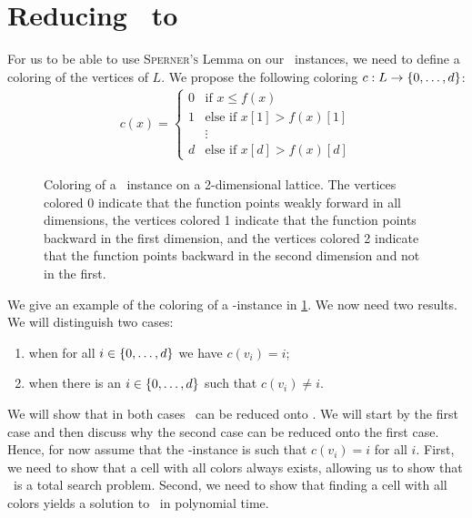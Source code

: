 \section{Reducing \Tarskistar\ to \Sperner}\label{sec:tarskistar_to_sperner}

For us to be able to use \textsc{Sperner's} Lemma on our \Tarskistar\ instances, we need to define a coloring of the vertices of $L$. We propose the following coloring $c : L \rightarrow \left\{0, \dots, d\right\}$:
\begin{align*}
	c(x) =
	\begin{cases}
		0 & \text{if $x \leq f(x)$}         \\
		1 & \text{else if $x[1] > f(x)[1]$} \\
		  & \vdots                          \\
		d & \text{else if $x[d] > f(x)[d]$}
	\end{cases}
\end{align*}

\begin{figure}[ht]
	\centering
	\caption[Coloring of a \Tarskistar-instance]{Coloring of a \Tarskistar\ instance on a 2-dimensional lattice. The vertices colored 0 indicate that the function points weakly forward in all dimensions, the vertices colored 1 indicate that the function points backward in the first dimension, and the vertices colored 2 indicate that the function points backward in the second dimension and not in the first.}\label{fig:tarskistar_coloring}
\end{figure}

We give an example of the coloring of a \Tarski-instance in \cref{fig:tarskistar_coloring}. We now need two results. We will distinguish two cases:
\begin{enumerate}
	\item when for all $i \in \left\{0, \dots, d\right\}$ we have $c(v_i) = i$;
	\item when there is an $i \in \left\{0, \dots, d\right\}$ such that $c(v_i) \neq i$.
\end{enumerate}
We will show that in both cases \Tarskistar\ can be reduced onto \Sperner. We will start by the first case and then discuss why the second case can be reduced onto the first case. Hence, for now assume that the \Tarskistar-instance is such that $c(v_i) = i$ for all $i$. First, we need to show that a cell with all colors always exists, allowing us to show that \Tarskistar\ is a total search problem. Second, we need to show that finding a cell with all colors yields a solution to \Tarskistar\ in polynomial time.

